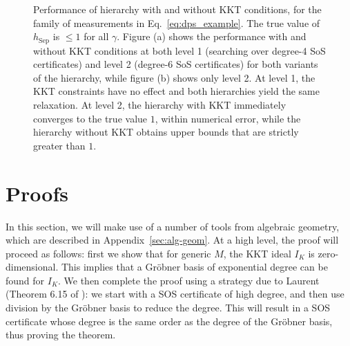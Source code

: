 \documentclass[aps,pra,notitlepage,preprintnumbers,11pt,tightenlines]{revtex4-1}
\DeclareMathOperator{\Sep}{Sep}
\begin{document}
\begin{figure}[h]
\centering
{}
\caption{Performance of hierarchy with and without KKT conditions, for
  the family of measurements in Eq.~\eqref{eq:dps_example}. The true
  value of $h_{\Sep}$ is $\leq 1$ for all $\gamma$. Figure (a) shows
  the performance with and without KKT conditions at both level 1
  (searching over degree-4 SoS certificates) and level 2 (degree-6 SoS
certificates) for both variants of the hierarchy, while figure (b)
shows only level 2. At level 1, the KKT constraints have no effect and
both hierarchies yield the same relaxation. At level 2, the hierarchy
with KKT immediately converges to the true value $1$, within numerical
error, while the
hierarchy without KKT obtains upper bounds that are strictly greater
than $1$.}
\label{fig:numerics}
\end{figure}

\section{Proofs}\label{sec:proofs}

In this section, we will make use of a number of tools from algebraic
geometry, which are described in Appendix~\ref{sec:alg-geom}. At a high level, the proof will proceed as follows: first we show that for
generic $M$, the KKT ideal $I_K$ is zero-dimensional. This implies
that a Gr\"{o}bner basis of exponential degree can be found for
$I_K$. We then complete the proof using a strategy due to Laurent
(Theorem 6.15 of \cite{laurent:2009}): we start with a SOS certificate of
high degree, and then use division by the Gr\"{o}bner basis to reduce
the degree. This will result in a SOS certificate whose degree is the
same order as the degree of the Gr\"{o}bner basis, thus proving the theorem.
\end{document}
